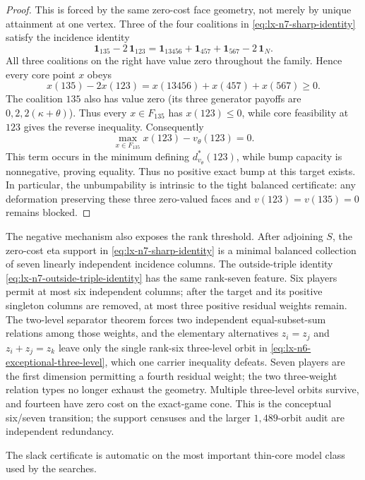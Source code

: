 \begin{proof}
This is forced by the same zero-cost face geometry, not merely by unique
attainment at one vertex.  Three of the four coalitions in
\eqref{eq:lx-n7-sharp-identity} satisfy the incidence identity
\[
 \mathbf1_{135}-2\,\mathbf1_{123}
 =\mathbf1_{13456}+\mathbf1_{457}+\mathbf1_{567}
   -2\,\mathbf1_N.                                    \tag{NB}
\]
All three coalitions on the right have value zero throughout the family.
Hence every core point $x$ obeys
\[
 x(135)-2x(123)
 =x(13456)+x(457)+x(567)\geq0.
\]
The coalition $135$ also has value zero (its three generator payoffs are
$0,2,2(\kappa+\theta)$).  Thus every $x\in F_{135}$ has $x(123)\leq0$, while core
feasibility at $123$ gives the reverse inequality.  Consequently
\[
 \max_{x\in F_{135}}x(123)-v_\theta(123)=0.
\]
This term occurs in the minimum defining $d^*_{v_\theta}(123)$, while bump
capacity is nonnegative, proving equality.  Thus no positive exact bump at
this target exists.  In particular, the unbumpability is intrinsic to the
tight balanced certificate: any deformation preserving these three
zero-valued faces and $v(123)=v(135)=0$ remains blocked.
\end{proof}

The negative mechanism also exposes the rank threshold.  After adjoining
$S$, the zero-cost eta support in \eqref{eq:lx-n7-sharp-identity} is a minimal
balanced collection of seven linearly independent incidence columns.  The
outside-triple identity \eqref{eq:lx-n7-outside-triple-identity} has the same
rank-seven feature.  Six players permit at most six independent columns;
after the target and its positive singleton columns are removed, at most
three positive residual weights remain.  The two-level separator theorem
forces two independent equal-subset-sum relations among those weights, and
the elementary alternatives $z_i=z_j$ and $z_i+z_j=z_k$ leave only the single
rank-six three-level orbit in
\eqref{eq:lx-n6-exceptional-three-level}, which one carrier inequality
defeats.  Seven players are the first dimension permitting a fourth residual
weight; the two three-weight relation types no longer exhaust the geometry.
Multiple three-level orbits survive, and fourteen have zero cost on the
exact-game cone.  This is the conceptual six/seven transition; the support
censuses and the larger $1{,}489$-orbit audit are independent redundancy.

The slack certificate is automatic on the most important thin-core model
class used by the searches.

